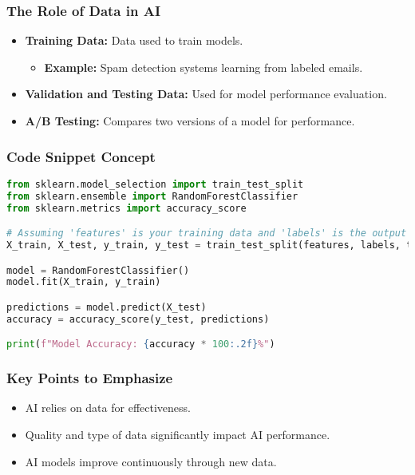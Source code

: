 \documentclass[aspectratio=169]{beamer}
\begin{document}
\begin{frame}[fragile]
    \frametitle{The Role of Data in AI}
    \begin{itemize}
        \item \textbf{Training Data:} Data used to train models.
            \begin{itemize}
                \item \textbf{Example:} Spam detection systems learning from labeled emails.
            \end{itemize}
        \item \textbf{Validation and Testing Data:} Used for model performance evaluation.
        \item \textbf{A/B Testing:} Compares two versions of a model for performance.
    \end{itemize}
\end{frame}

\begin{frame}[fragile]
    \frametitle{Code Snippet Concept}
    \begin{lstlisting}[language=Python]
from sklearn.model_selection import train_test_split
from sklearn.ensemble import RandomForestClassifier
from sklearn.metrics import accuracy_score

# Assuming 'features' is your training data and 'labels' is the output
X_train, X_test, y_train, y_test = train_test_split(features, labels, test_size=0.2)

model = RandomForestClassifier()
model.fit(X_train, y_train)

predictions = model.predict(X_test)
accuracy = accuracy_score(y_test, predictions)

print(f"Model Accuracy: {accuracy * 100:.2f}%")
    \end{lstlisting}
\end{frame}

\begin{frame}[fragile]
    \frametitle{Key Points to Emphasize}
    \begin{itemize}
        \item AI relies on data for effectiveness.
        \item Quality and type of data significantly impact AI performance.
        \item AI models improve continuously through new data.
    \end{itemize}
\end{frame}
\end{document}
